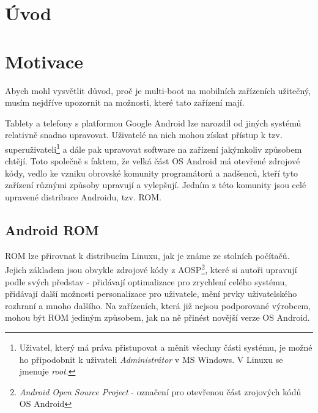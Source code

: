 \documentclass[12pt, a4paper, oneside]{article}
\newcommand{\D}{\medskip \noindent} %
\newcommand{\B}{\textbf} %
\newcommand{\It}{\textit}  %
\begin{document}

\addtolength{\textheight}{30mm} %

\newpage
\pagestyle{plain}

\setlength{\voffset}{-20mm} %
\setcounter{page}{1}  %

\tableofcontents  %

\addtolength{\textheight}{-30mm} %
\newpage
\setlength{\voffset}{0mm} %
\pagestyle{plain}

%
\section*{Úvod}
\label{uvod}



\section{Motivace}
Abych mohl vysvětlit důvod, proč je multi-boot na mobilních zařízeních užitečný, musím nejdříve upozornit na možnosti, které tato zařízení mají.

Tablety a telefony s platformou Google Android lze narozdíl od jiných systémů relativně snadno upravovat. Uživatelé na nich mohou získat přístup k tzv. superuživateli\footnote{Uživatel, který má práva přistupovat a měnit všechny části systému, je možné ho připodobnit k uživateli \It{Administrátor} v MS Windows. V Linuxu se jmenuje \It{root}.} a dále pak upravovat software na zařízení jakýmkoliv způsobem chtějí. Toto společně s faktem, že velká část OS Android má otevřené zdrojové kódy, vedlo ke vzniku obrovské komunity programátorů a nadšenců, kteří tyto zařízení různými způsoby upravují a vylepšují. Jedním z  této komunity jsou celé upravené distribuce Androidu, tzv. ROM.

\subsection{Android ROM}
ROM lze přirovnat k distribucím Linuxu, jak je známe ze stolních počítačů. Jejich základem jsou obvykle zdrojové kódy z AOSP\cite{aosp}\footnote{\It{Android Open Source Project} - označení pro otevřenou část zrojových kódů OS Android}, které si autoři upravují podle svých představ - přidávají optimalizace pro zrychlení celého systému, přidávají další možnosti personalizace pro uživatele, mění prvky uživatelského rozhraní a mnoho dalšího. Na zařízeních, která již nejsou podporované výrobcem, mohou být ROM jediným způsobem, jak na ně přinést novější verze OS Android.
\end{document}
